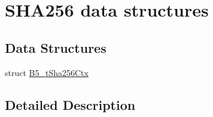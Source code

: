 \hypertarget{group__sha_str}{\section{S\-H\-A256 data structures}
\label{group__sha_str}
}
\subsection*{Data Structures}
\begin{DoxyCompactItemize}
\item 
struct \hyperlink{struct_b5__t_sha256_ctx}{B5\-\_\-t\-Sha256\-Ctx}
\end{DoxyCompactItemize}


\subsection{Detailed Description}
